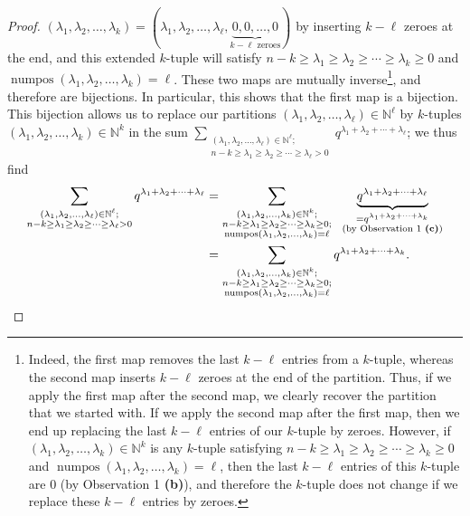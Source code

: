 \begin{proof}
{$\left(  \lambda_{1},\lambda_{2},\ldots,\lambda_{k}\right)  =\left(
\lambda_{1},\lambda_{2},\ldots,\lambda_{\ell},\underbrace{0,0,\ldots
,0}_{k-\ell\text{ zeroes}}\right)  $ by inserting $k-\ell$ zeroes at the end,
and this extended $k$-tuple will satisfy $n-k\geq\lambda_{1}\geq\lambda
_{2}\geq\cdots\geq\lambda_{k}\geq0$ and $\operatorname*{numpos}\left(
\lambda_{1},\lambda_{2},\ldots,\lambda_{k}\right)  =\ell$}. These two maps are
mutually inverse\footnote{Indeed, the first map removes the last $k-\ell$
entries from a $k$-tuple, whereas the second map inserts $k-\ell$ zeroes at
the end of the partition. Thus, if we apply the first map after the second
map, we clearly recover the partition that we started with. If we apply the
second map after the first map, then we end up replacing the last $k-\ell$
entries of our $k$-tuple by zeroes. However, if $\left(  \lambda_{1}%
,\lambda_{2},\ldots,\lambda_{k}\right)  \in\mathbb{N}^{k}$ is any $k$-tuple
satisfying $n-k\geq\lambda_{1}\geq\lambda_{2}\geq\cdots\geq\lambda_{k}\geq0$
and $\operatorname*{numpos}\left(  \lambda_{1},\lambda_{2},\ldots,\lambda
_{k}\right)  =\ell$, then the last $k-\ell$ entries of this $k$-tuple are $0$
(by Observation 1 \textbf{(b)}), and therefore the $k$-tuple does not change
if we replace these $k-\ell$ entries by zeroes.}, and therefore are
bijections. In particular, this shows that the first map is a bijection. This
bijection allows us to replace our partitions $\left(  \lambda_{1},\lambda
_{2},\ldots,\lambda_{\ell}\right)  \in\mathbb{N}^{\ell}$ by $k$-tuples
$\left(  \lambda_{1},\lambda_{2},\ldots,\lambda_{k}\right)  \in\mathbb{N}^{k}$
in the sum $\sum_{\substack{\left(  \lambda_{1},\lambda_{2},\ldots
,\lambda_{\ell}\right)  \in\mathbb{N}^{\ell};\\n-k\geq\lambda_{1}\geq
\lambda_{2}\geq\cdots\geq\lambda_{\ell}>0}}q^{\lambda_{1}+\lambda_{2}%
+\cdots+\lambda_{\ell}}$; we thus find%
\begin{align*}
\sum_{\substack{\left(  \lambda_{1},\lambda_{2},\ldots,\lambda_{\ell}\right)
\in\mathbb{N}^{\ell};\\n-k\geq\lambda_{1}\geq\lambda_{2}\geq\cdots\geq
\lambda_{\ell}>0}}q^{\lambda_{1}+\lambda_{2}+\cdots+\lambda_{\ell}}  &
=\sum_{\substack{\left(  \lambda_{1},\lambda_{2},\ldots,\lambda_{k}\right)
\in\mathbb{N}^{k};\\n-k\geq\lambda_{1}\geq\lambda_{2}\geq\cdots\geq\lambda
_{k}\geq0;\\\operatorname*{numpos}\left(  \lambda_{1},\lambda_{2}%
,\ldots,\lambda_{k}\right)  =\ell}}\ \ \underbrace{q^{\lambda_{1}+\lambda
_{2}+\cdots+\lambda_{\ell}}}_{\substack{=q^{\lambda_{1}+\lambda_{2}%
+\cdots+\lambda_{k}}\\\text{(by Observation 1 \textbf{(c)})}}}\\
&  =\sum_{\substack{\left(  \lambda_{1},\lambda_{2},\ldots,\lambda_{k}\right)
\in\mathbb{N}^{k};\\n-k\geq\lambda_{1}\geq\lambda_{2}\geq\cdots\geq\lambda
_{k}\geq0;\\\operatorname*{numpos}\left(  \lambda_{1},\lambda_{2}%
,\ldots,\lambda_{k}\right)  =\ell}}q^{\lambda_{1}+\lambda_{2}+\cdots
+\lambda_{k}}.
\end{align*}



\end{proof}
